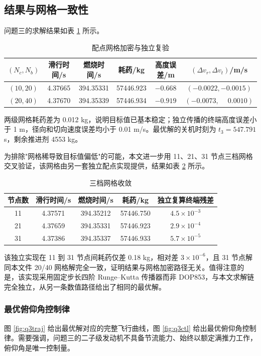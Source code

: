 \documentclass[withoutpreface,bwprint]{cumcmthesis}
\begin{document}
\subsection{结果与网格一致性}
问题三的求解结果如表 \ref{tab:q3res} 所示。

\begin{table}[!htbp]
\caption{配点网格加密与独立复验}
\label{tab:q3res}
\centering
\begin{tabular}{c|c|c|c|c|c}
\toprule[1.5pt]
$(N_c,N_b)$ & 滑行时间/s & 燃烧时间/s & 耗药/kg & 高度误差/m & $(\Delta v_r,\Delta v_t)$/m/s \\
\midrule[1pt]
$(10,20)$ & 4.37665 & 394.35331 & 57446.923 & $-0.668$ & $(-0.0022,-0.0015)$ \\
$(20,40)$ & 4.37670 & 394.35339 & 57446.934 & $-0.919$ & $(-0.0073,\phantom{-}0.0010)$ \\
\bottomrule[1.5pt]
\end{tabular}
\end{table}

两级网格耗药差为 0.012 kg，说明目标值已基本稳定；独立传播的终端高度误差小于 1 m，径向和切向速度误差均小于 0.01 m/s。最优解的关机时刻为 $t_3=547.791$ s，剩余推进剂 4553 kg。

为排除"网格稀导致目标值偏低"的可能，本文进一步用 11、21、31 节点三档网格交叉验证，该网格由另一套独立配点实现提供，结果如表 \ref{tab:q3mesh} 所示。

\begin{table}[!htbp]
\caption{三档网格收敛}
\label{tab:q3mesh}
\centering
\begin{tabular}{c|c|c|c|c}
\toprule[1.5pt]
节点数 & 滑行时间/s & 燃烧时间/s & 耗药/kg & 独立复算终端残差 \\
\midrule[1pt]
11 & 4.37571 & 394.35212 & 57446.750 & $4.5\times10^{-3}$ \\
21 & 4.37659 & 394.35331 & 57446.923 & $2.9\times10^{-4}$ \\
31 & 4.37386 & 394.35337 & 57446.933 & $5.7\times10^{-5}$ \\
\bottomrule[1.5pt]
\end{tabular}
\end{table}

该独立实现在 11 到 31 节点间耗药仅差 0.18 kg，相对差 $3\times10^{-6}$，且 31 节点解同本文件 20/40 网格解完全一致，证明结果与网格加密路径无关。值得注意的是，该实现采用固定步长四阶 Runge--Kutta 传播器而非 DOP853，与本文求解链完全独立，从另一条数值路径给出了相同的最优解。

\subsubsection{最优俯仰角控制律}
图 \ref{fig:q3traj} 给出最优解对应的完整飞行曲线，图 \ref{fig:q3ctl} 给出最优俯仰角控制律。需要强调，问题三的二子级发动机不具备节流能力、始终以额定满推力工作，俯仰角是唯一控制量。
\end{document}
